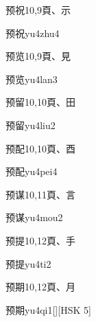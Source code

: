 \begin{entry}{预祝}{10,9}{⾴、⽰}
  \begin{phonetics}{预祝}{yu4zhu4}
  \end{phonetics}
\end{entry}

\begin{entry}{预览}{10,9}{⾴、⾒}
  \begin{phonetics}{预览}{yu4lan3}
  \end{phonetics}
\end{entry}

\begin{entry}{预留}{10,10}{⾴、⽥}
  \begin{phonetics}{预留}{yu4liu2}
  \end{phonetics}
\end{entry}

\begin{entry}{预配}{10,10}{⾴、⾣}
  \begin{phonetics}{预配}{yu4pei4}
  \end{phonetics}
\end{entry}

\begin{entry}{预谋}{10,11}{⾴、⾔}
  \begin{phonetics}{预谋}{yu4mou2}
  \end{phonetics}
\end{entry}

\begin{entry}{预提}{10,12}{⾴、⼿}
  \begin{phonetics}{预提}{yu4ti2}
  \end{phonetics}
\end{entry}

\begin{entry}{预期}{10,12}{⾴、⽉}
  \begin{phonetics}{预期}{yu4qi1}[][HSK 5]
  \end{phonetics}
\end{entry}

